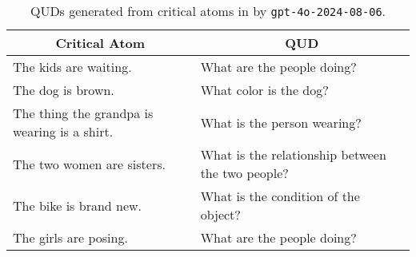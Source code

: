 \begin{table*}
\small
\centering
\begin{tabular}{ll} 
\toprule
\multicolumn{1}{c}{\textbf{Critical Atom}} & \multicolumn{1}{c}{\textbf{QUD}} \\ 
\hline
The kids are waiting. & What are the people doing? \\
The dog is brown. & What color is the dog? \\
The thing the grandpa is wearing is a shirt. & What is the person wearing? \\
The two women are sisters. & What is the relationship between the two people? \\
The bike is brand new. & What is the condition of the object? \\
The girls are posing. & What are the people doing? \\
\bottomrule
\end{tabular}
\caption{QUDs generated from critical atoms in \dsnlitest by \texttt{gpt-4o-2024-08-06}.}
\label{tab:quds-generated}
\end{table*}